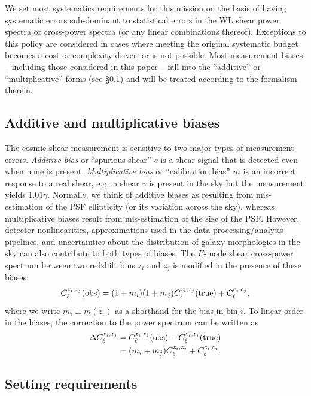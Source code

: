 \documentclass[aps,prd, amsmath,amssymb,superscriptaddress,showkeys,nofootinbib,reprint,preprintnumbers]{revtex4-1}
\begin{document}
We set most systematics requirements for this mission on the basis of
having systematic errors sub-dominant to statistical errors in the WL
shear power spectra or cross-power spectra (or any linear combinations
thereof). Exceptions to this policy are considered in cases
where meeting the original systematic budget becomes a cost or
complexity driver, or is not possible. Most measurement biases -- including those considered in this paper -- fall
into the ``additive'' or ``multiplicative'' forms (see
\S\ref{ss:add_mult}) and will be treated according to the formalism
therein.

\subsection{Additive and multiplicative biases}
\label{ss:add_mult}

The cosmic shear measurement is sensitive to two major types of
measurement errors. {\em Additive bias} or ``spurious shear'' $c$ is a
shear signal that is detected even when none is present. {\em
Multiplicative bias} or ``calibration bias'' $m$ is an incorrect response
to a real shear, e.g.\ a shear $\gamma$ is present in the sky but the
measurement yields 1.01$\gamma$. Normally, we think of additive biases
as resulting from mis-estimation of the PSF ellipticity (or its
variation across the sky), whereas multiplicative biases result from
mis-estimation of the size of the PSF. However, detector
nonlinearities, approximations used in the data processing/analysis
pipelines, and uncertainties about the distribution of galaxy
morphologies in the sky can also contribute to both types of
biases.  The $E$-mode
shear cross-power spectrum between two redshift bins $z_i$ and $z_j$
is modified in the presence of these biases:
\begin{equation}
C_\ell^{z_i,z_j}({\rm obs}) = (1+m_i)(1+m_j)C_\ell^{z_i,z_j}({\rm true}) + C_\ell^{c_i,c_j},
\label{eq:mod}
\end{equation}
where we write $m_i\equiv m(z_i)$ as a shorthand for the bias in bin $i$. To linear order in
the biases, the correction to the power spectrum can be written as
\begin{align}
\Delta C_\ell^{z_i,z_j} &= C_\ell^{z_i,z_j}({\rm obs}) - C_\ell^{z_i,z_j}({\rm true}) \nonumber\\
&= (m_i+m_j)C_\ell^{z_i,z_j}+C_\ell^{c_i,c_j}.
\label{eq:Delta C}
\end{align}

\subsection{Setting requirements}
\end{document}
